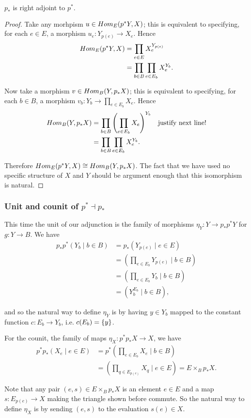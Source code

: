 \begin{proposition}
	$p_*$ is right adjoint to $p^*$.
\end{proposition}
\begin{proof}
	Take any morhpism $u\in Hom_E(p^*Y,X)$; this is equivalent to specifying, for each $e\in E$, a morphism $u_e: Y_{p(e)}\to X_e$. Hence
	\begin{align*}
		Hom_E(p^*Y,X) &= \prod_{e\in E} X_e^{Y_{p(e)}}\\
			&= \prod_{b\in B} \prod_{e\in E_b} X_e^{Y_b}.
	\end{align*}

	Now take a morphism $v\in Hom_B(Y,p_*X)$; this is equivalent to specifying, for each $b\in B$, a morphism $v_b: Y_b \to \prod_{e\in E_b} X_e$. Hence
	\begin{align*}
		Hom_B(Y,p_*X) &= \prod_{b\in B} \left( \prod_{e\in E_b} X_e \right)^{Y_b} &&\text{justify next line!}\\
			&= \prod_{b\in B} \prod_{e\in E_b} X_e^{Y_b}.
	\end{align*}

	Therefore $Hom_E(p^*Y, X) \cong Hom_B(Y,p_*X)$. The fact that we have used no specific structure of $X$ and $Y$ should be argument enough that this isomorphism is natural.
\end{proof}

\subsubsection{Unit and counit of $p^* \dashv p_*$}
This time the unit of our adjunction is the family of morphisms $\eta_Y : Y \to p_*p^*Y$ for $g: Y\to B$. We have
\begin{align*}
	p_*p^*\left( Y_b \mid b\in B \right) &= p_*\left( Y_{p(e)} \mid e\in E \right)\\
		&= \left( \prod_{e\in E_b} Y_{p(e)} \mid b\in B \right)\\
		&= \left( \prod_{e\in E_b} Y_b \mid b\in B \right)\\
		&= \left( Y_b^{E_b} \mid b\in B \right),
\end{align*}

and so the natural way to define $\eta_Y$ is by having $y\in Y_b$ mapped to the constant function $c : E_b\to Y_b$, i.e. $c(E_b)=\{y\}$.

For the counit, the family of maps $\eta_X : p^*p_*X \to X$, we have
\begin{align*}
	p^*p_*\left( X_e \mid e\in E \right) &= p^*\left( \prod_{e\in E_b}X_e \mid b\in B \right)\\
		&= \left( \prod_{q\in E_{p(e)}} X_q \mid e\in E\right) = E\times_B p_*X.
\end{align*}

Note that any pair $(e,s)\in E\times_B p_*X$ is an element $e\in E$ and a map $s:E_{p(e)}\to X$ making the triangle shown before commute. So the natural way to define $\eta_X$ is by sending $(e,s)$ to the evaluation $s(e)\in X$.

\pagebreak
